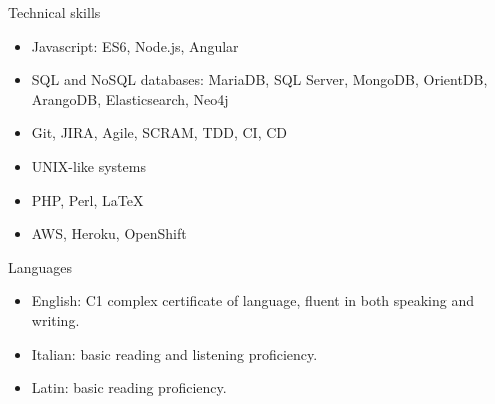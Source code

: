 Technical skills

  \begin{itemize}
    \item{Javascript: ES6, Node.js, Angular}
    \item{SQL and NoSQL databases: MariaDB, SQL Server, 
      MongoDB, OrientDB, ArangoDB, Elasticsearch, Neo4j}
    \item{Git, JIRA, Agile, SCRAM, TDD, CI, CD}
    \item{UNIX-like systems}
    \item{PHP, Perl, \LaTeX}
    \thispagestyle{fancy}
    \item{AWS, Heroku, OpenShift}
  \end{itemize}

Languages
  
  \begin{itemize}
    \item{English: C1 complex certificate of language, fluent in both speaking and writing.}
    \item{Italian: basic reading and listening proficiency.}
    \item{Latin: basic reading proficiency.}
  \end{itemize}

\thispagestyle{fancy}

